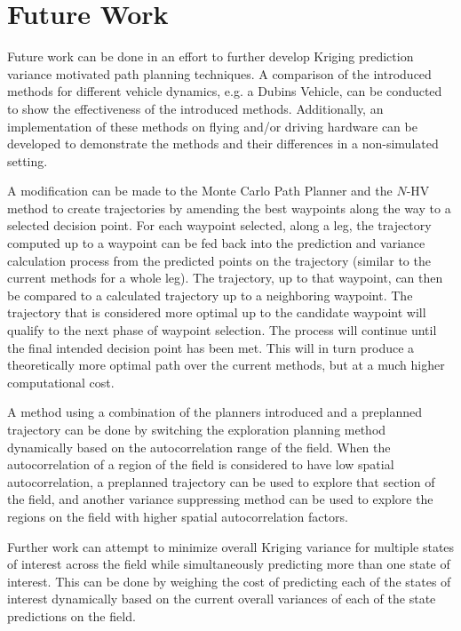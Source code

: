 \chapter{Future Work}
Future work can be done in an effort to further develop Kriging prediction variance motivated path planning techniques. A comparison of the introduced methods for different vehicle dynamics, e.g. a Dubins Vehicle, can be conducted to show the effectiveness of the introduced methods. Additionally, an implementation of these methods on flying and/or driving hardware can be developed to demonstrate the methods and their differences in a non-simulated setting.

A modification can be made to the Monte Carlo Path Planner and the $N$-HV method to create trajectories by amending the best waypoints along the way to a selected decision point. For each waypoint selected, along a leg, the trajectory computed up to a waypoint can be fed back into the prediction and variance calculation process from the predicted points on the trajectory (similar to the current methods for a whole leg). The trajectory, up to that waypoint, can then be compared to a calculated trajectory up to a neighboring waypoint. The trajectory that is considered more optimal up to the candidate waypoint will qualify to the next phase of waypoint selection. The process will continue until the final intended decision point has been met. This will in turn produce a theoretically more optimal path over the current methods, but at a much higher computational cost.

A method using a combination of the planners introduced and a preplanned trajectory can be done by switching the exploration planning method dynamically based on the autocorrelation range of the field. When the autocorrelation of a region of the field is considered to have low spatial autocorrelation, a preplanned trajectory can be used to explore that section of the field, and another variance suppressing method can be used to explore the regions on the field with higher spatial autocorrelation factors.

Further work can attempt to minimize overall Kriging variance for multiple states of interest across the field while simultaneously predicting more than one state of interest. This can be done by weighing the cost of predicting each of the states of interest dynamically based on the current overall variances of each of the state predictions on the field.
